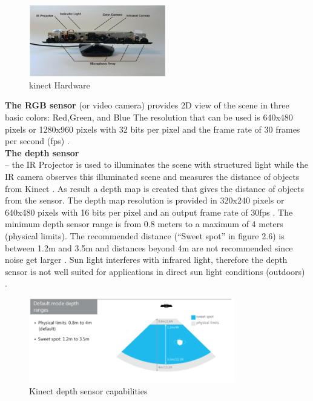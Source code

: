 \begin{figure}[H]
\centering
\includegraphics[width=0.53\textwidth]{img/kinectcamera2.png}
\caption{ kinect Hardware }
\label{fig:cam2}
\end{figure}

\textbf{The RGB sensor}  (or video camera) provides 2D view of the scene in three basic colors: Red,Green, and Blue \cite{kinect15} The resolution that can be used is 640x480 pixels or 1280x960 pixels with 32 bits per pixel and the frame rate of 30 frames per second (fps) \cite{kinect15}. \\

\textbf{The depth sensor} \\
– the IR Projector is used to illuminates the scene with structured light while the IR camera observes this illuminated scene and measures the distance of objects from Kinect \cite{kinect15}. As result a depth map is created that gives the distance of objects from the sensor. The depth
map resolution is provided in 320x240 pixels or 640x480 pixels with 16 bits per pixel and an  output frame rate of 30fps \cite{kinect15}. The minimum depth sensor range is from 0.8 meters to a maximum of 4 meters (physical limits). The recommended distance (“Sweet spot” in figure 2.6) is between 1.2m and 3.5m and distances beyond 4m are not recommended since noise get larger \cite{kinect17}. Sun light interferes with infrared light, therefore the depth sensor is not well suited for applications in direct sun light conditions (outdoors)\cite{kinect17} .  

\begin{figure}[H]
\centering
\includegraphics[width=0.8\textwidth]{img/afterworking1.png}
\caption{Kinect depth sensor capabilities}
\label{fig:cam3}
\end{figure}

